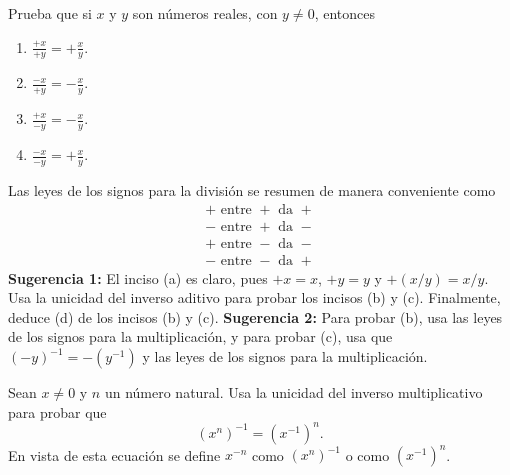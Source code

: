 \documentclass[12pt,a4paper]{book}
\begin{document}
    \begin{ejercicio}\label{ej:20}
        Prueba que si $x$ y
        $y$ son números reales, con $y\neq 0$, entonces
        \begin{enumerate}[nosep]
            \item $\frac{+x}{+y}=+\frac{x}{y}$.
            \item $\frac{-x}{+y}=-\frac{x}{y}$.
            \item $\frac{+x}{-y}=-\frac{x}{y}$.
            \item $\frac{-x}{-y}=+\frac{x}{y}$.
        \end{enumerate}
        Las leyes de los signos para la división se resumen de manera conveniente
        como
        \begin{align*}
            +\text{ entre }+\text{ da }+\\
            -\text{ entre }+\text{ da }-\\
            +\text{ entre }-\text{ da }-\\
            -\text{ entre }-\text{ da }+
        \end{align*}
        \textbf{Sugerencia 1:} El inciso (a) es claro, pues $+x=x$, $+y=y$ y $+(x/y)=
        x/y$. Usa la unicidad del inverso aditivo para probar los incisos (b) y (c).
        Finalmente, deduce (d) de los incisos (b) y (c). \textbf{Sugerencia 2:} Para probar
        (b), usa las leyes de los signos para la multiplicación, y para probar (c), usa
        que $(-y)^{-1}=-(y^{-1})$ y las leyes de los signos para la multiplicación.
    \end{ejercicio}

    \begin{ejercicio}\label{ej:21}
        Sean $x\neq 0$ y $n$ un número
        natural. Usa la unicidad del inverso multiplicativo para probar que
        \begin{equation*}
            (x^{n})^{-1}=(x^{-1})^{n}.
        \end{equation*}
        En vista de esta ecuación se define $x^{-n}$ como $(x^{n})^{-1}$ o como $(x^{-1})^{n}$.
    \end{ejercicio}
\end{document}
